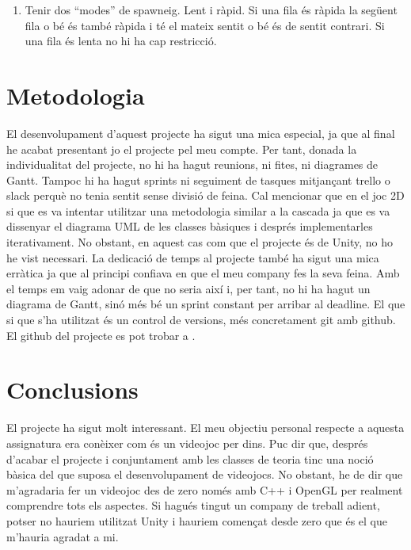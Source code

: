 \documentclass{article}
\begin{document}
\begin{enumerate}
	\item Tenir dos ``modes'' de spawneig. Lent i ràpid. Si una fila és
	ràpida la següent fila o bé és també ràpida i té el mateix sentit
	o bé és de sentit contrari. Si una fila és lenta no hi ha cap restricció.

\end{enumerate}


\section{Metodologia}
El desenvolupament d'aquest projecte ha sigut una mica especial, ja que
al final he acabat presentant jo el projecte pel meu compte. Per tant,
donada la individualitat del projecte, no hi ha hagut reunions, ni fites, ni
diagrames de Gantt. Tampoc hi ha hagut sprints ni seguiment de
tasques mitjançant trello o slack perquè no tenia sentit sense
divisió de feina. \newline
Cal mencionar que en el joc 2D si que es va intentar utilitzar una metodologia
similar a la cascada ja que es va dissenyar el diagrama UML de les classes
bàsiques i després implementarles iterativament. No obstant, en aquest cas
com que el projecte és de Unity, no ho he vist necessari. \newline
La dedicació de temps al projecte també ha sigut una mica erràtica ja que al principi confiava
en que el meu company fes la seva feina. Amb el temps em vaig adonar de que
no seria així i, per tant, no hi ha hagut un diagrama de Gantt, sinó més bé
un sprint constant per arribar al deadline. El que si que s'ha utilitzat és un control de versions, més concretament git
amb github. El github del projecte es pot trobar a \cite{githubProjecte}.

\section{Conclusions}
El projecte ha sigut molt interessant. El meu objectiu personal respecte a
aquesta assignatura era conèixer com és un videojoc per dins.
Puc dir que, després d'acabar el projecte i conjuntament amb les classes de
teoria tinc una noció bàsica del que suposa el desenvolupament de videojocs.
No obstant, he de dir que m'agradaria fer un videojoc des de zero només
amb C++ i OpenGL per realment comprendre tots els aspectes.
Si hagués tingut un company de treball adient, potser no hauriem utilitzat
Unity i hauriem començat desde zero que és el que m'hauria agradat a mi.



\end{document}
